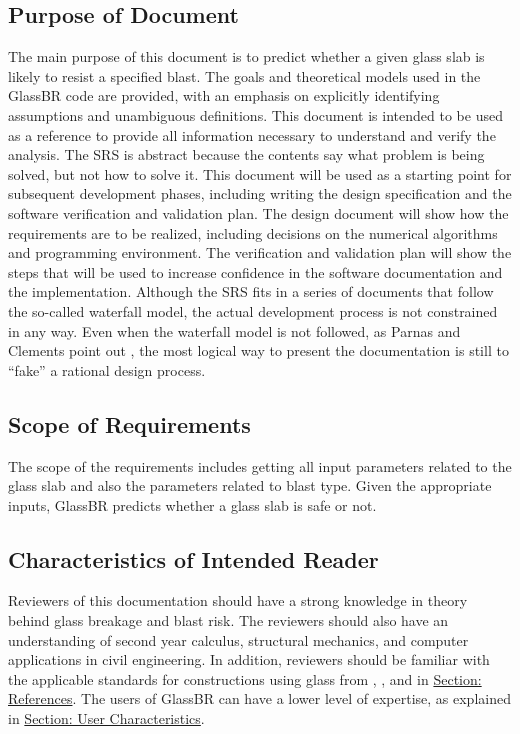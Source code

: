 \documentclass[12pt]{article}
\begin{document}
\subsection{Purpose of Document}
\label{Sec:DocPurpose}
The main purpose of this document is to predict whether a given glass slab is likely to resist a specified blast. The goals and theoretical models used in the GlassBR code are provided, with an emphasis on explicitly identifying assumptions and unambiguous definitions. This document is intended to be used as a reference to provide all information necessary to understand and verify the analysis. The SRS is abstract because the contents say what problem is being solved, but not how to solve it.
This document will be used as a starting point for subsequent development phases, including writing the design specification and the software verification and validation plan. The design document will show how the requirements are to be realized, including decisions on the numerical algorithms and programming environment. The verification and validation plan will show the steps that will be used to increase confidence in the software documentation and the implementation. Although the SRS fits in a series of documents that follow the so-called waterfall model, the actual development process is not constrained in any way. Even when the waterfall model is not followed, as Parnas and Clements point out \cite{parnasClements1986}, the most logical way to present the documentation is still to ``fake'' a rational design process.
\subsection{Scope of Requirements}
\label{Sec:ReqsScope}
The scope of the requirements includes getting all input parameters related to the glass slab and also the parameters related to blast type. Given the appropriate inputs, GlassBR predicts whether a glass slab is safe or not.
\subsection{Characteristics of Intended Reader}
\label{Sec:ReaderChars}
Reviewers of this documentation should have a strong knowledge in theory behind glass breakage and blast risk. The reviewers should also have an understanding of second year calculus, structural mechanics, and computer applications in civil engineering. In addition, reviewers should be familiar with the applicable standards for constructions using glass from \cite{astm2009}, \cite{astm2012}, and \cite{astm2016} in \hyperref[Sec:References]{Section: References}. The users of GlassBR can have a lower level of expertise, as explained in \hyperref[Sec:UserChars]{Section: User Characteristics}.
\end{document}

